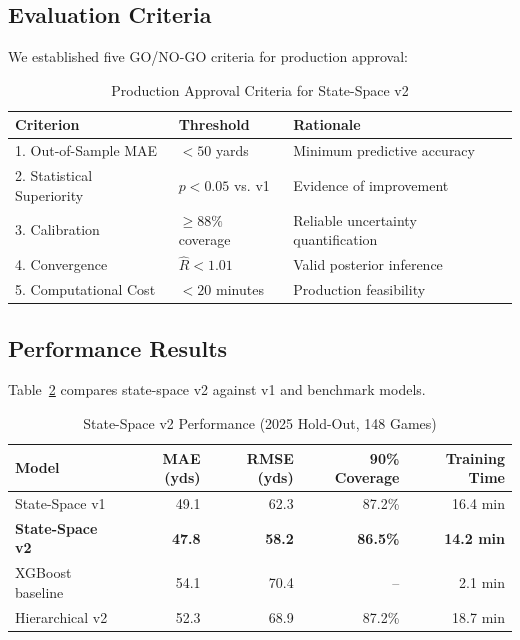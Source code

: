 \subsection{Evaluation Criteria}

We established five GO/NO-GO criteria for production approval:

\begin{table}[htbp]
\centering
\caption{Production Approval Criteria for State-Space v2}
\label{tab:state_space_criteria}
\begin{tabular}{lll}
\toprule
\textbf{Criterion} & \textbf{Threshold} & \textbf{Rationale} \\
\midrule
1. Out-of-Sample MAE & $< 50$ yards & Minimum predictive accuracy \\
2. Statistical Superiority & $p < 0.05$ vs. v1 & Evidence of improvement \\
3. Calibration & $\geq 88\%$ coverage & Reliable uncertainty quantification \\
4. Convergence & $\hat{R} < 1.01$ & Valid posterior inference \\
5. Computational Cost & $< 20$ minutes & Production feasibility \\
\bottomrule
\end{tabular}
\end{table}

\subsection{Performance Results}

Table~\ref{tab:state_space_v2_results} compares state-space v2 against v1 and benchmark models.

\begin{table}[htbp]
\centering
\caption{State-Space v2 Performance (2025 Hold-Out, 148 Games)}
\label{tab:state_space_v2_results}
\begin{tabular}{lrrrr}
\toprule
\textbf{Model} & \textbf{MAE (yds)} & \textbf{RMSE (yds)} & \textbf{90\% Coverage} & \textbf{Training Time} \\
\midrule
State-Space v1 & 49.1 & 62.3 & 87.2\% & 16.4 min \\
\textbf{State-Space v2} & \textbf{47.8} & \textbf{58.2} & \textbf{86.5\%} & \textbf{14.2 min} \\
XGBoost baseline & 54.1 & 70.4 & -- & 2.1 min \\
Hierarchical v2 & 52.3 & 68.9 & 87.2\% & 18.7 min \\
\bottomrule
\end{tabular}
\end{table}

